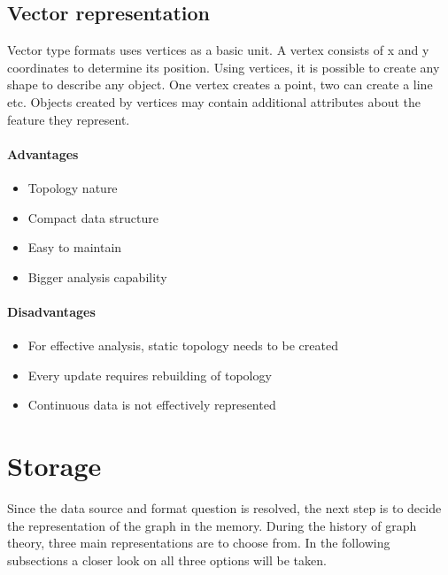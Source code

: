 \documentclass[thesis=M,english]{FITthesis}[2012/10/20]
\begin{document}
\subsection{Vector representation}
Vector type formats uses vertices as a basic unit. A vertex consists of x and y coordinates to determine its position. Using vertices, it is possible to create any shape to describe any object. One vertex creates a point, two can create a line etc. Objects created by vertices may contain additional attributes about the feature they represent.

\paragraph*{Advantages}
\begin{itemize}[noitemsep]
\item Topology nature
\item Compact data structure
\item Easy to maintain
\item Bigger analysis capability
\end{itemize}

\paragraph*{Disadvantages}
\begin{itemize}[noitemsep]
\item For effective analysis, static topology needs to be created
\item Every update requires rebuilding of topology
\item Continuous data is not effectively represented
\end{itemize}



\section{Storage}
Since the data source and format question is resolved, the next step is to decide the representation of the graph in the memory. During the history of graph theory, three main representations are to choose from. In the following subsections a closer look on all three options will be taken.
\end{document}
